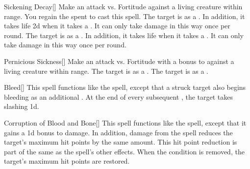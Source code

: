 \lowercase{\hypertarget{spell:Sickening Decay}{}}\label{spell:Sickening Decay}
\begin{apability}[\nth{1}]{\hypertarget{spell:Sickening Decay}{Sickening Decay}}[]
Make an attack vs. Fortitude against a living creature within \rngclose range.
\miss You regain the  spent to cast this spell.
\hit The target is  as a .
In addition, it takes life  \minus2d when it takes a .
It can only take damage in this way once per round.
\crit The target is  as a .
In addition, it takes life  when it takes a .
It can only take damage in this way once per round.
\end{apability}
\vspace{0.25em}



\lowercase{\hypertarget{spell:Pernicious Sickness}{}}\label{spell:Pernicious Sickness}
\begin{apability}[\nth{2}]{\hypertarget{spell:Pernicious Sickness}{Pernicious Sickness}}[]
Make an attack vs. Fortitude with a  bonus to  against a living creature within \rngmed range.
\hit The target is  as a .
\crit The target is  as a .
\end{apability}
\vspace{0.25em}



\lowercase{\hypertarget{spell:Bleed}{}}\label{spell:Bleed}
\begin{apability}[\nth{3}]{\hypertarget{spell:Bleed}{Bleed}}[]
This spell functions like the  spell, except that a struck target also begins bleeding as an additional .
At the end of every subsequent , the target takes slashing  \minus1d.
\end{apability}
\vspace{0.25em}



\lowercase{\hypertarget{spell:Corruption of Blood and Bone}{}}\label{spell:Corruption of Blood and Bone}
\begin{apability}[\nth{3}]{\hypertarget{spell:Corruption of Blood and Bone}{Corruption of Blood and Bone}}[]
This spell functions like the  spell, except that it gains a \plus1d bonus to damage.
In addition, damage from the spell reduces the target's maximum hit points by the same amount.
This hit point reduction is part of the same  as the spell's other effects.
When the condition is removed, the target's maximum hit points are restored.
\end{apability}
\vspace{0.25em}



